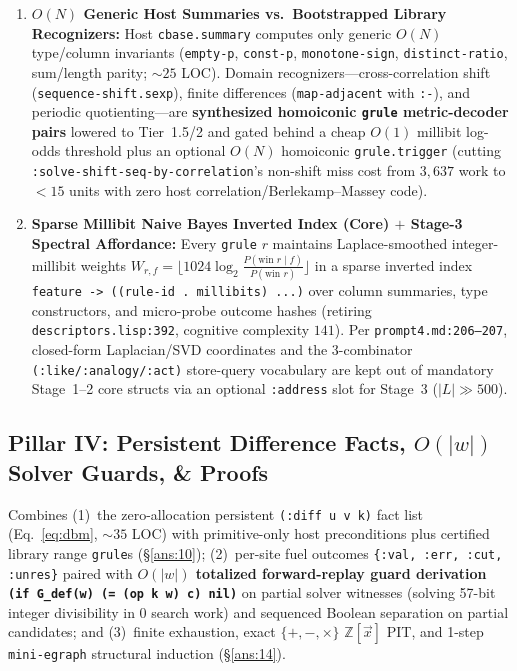 \documentclass[12pt]{article}
\begin{document}
\begin{enumerate}[leftmargin=1.6em, itemsep=0.2em]
  \item \textbf{$O(N)$ Generic Host Summaries vs.\ Bootstrapped Library Recognizers:} Host \texttt{cbase.summary} computes only generic $O(N)$ type/column invariants (\texttt{empty-p}, \texttt{const-p}, \texttt{monotone-sign}, \texttt{distinct-ratio}, sum/length parity; $\sim 25$ LOC). Domain recognizers---cross-correlation shift (\texttt{sequence-shift.sexp}), finite differences (\texttt{map-adjacent} with \texttt{:-}), and periodic quotienting---are \textbf{synthesized homoiconic \texttt{grule} metric-decoder pairs} lowered to Tier~1.5/2 and gated behind a cheap $O(1)$ millibit log-odds threshold plus an optional $O(N)$ homoiconic \texttt{grule.trigger} (cutting \texttt{:solve-shift-seq-by-correlation}'s non-shift miss cost from $3,637$ work to $<15$ units with zero host correlation/Berlekamp--Massey code).
  \item \textbf{Sparse Millibit Naive Bayes Inverted Index (Core) $+$ Stage-3 Spectral Affordance:} Every \texttt{grule} $r$ maintains Laplace-smoothed integer-millibit weights $W_{r,f} = \lfloor 1024 \log_2 \frac{P(\text{win }r\mid f)}{P(\text{win }r)}\rfloor$ in a sparse inverted index \texttt{feature -> ((rule-id . millibits) ...)} over column summaries, type constructors, and micro-probe outcome hashes (retiring \texttt{descriptors.lisp:392}, cognitive complexity $141$). Per \texttt{prompt4.md:206--207}, closed-form Laplacian/SVD coordinates and the 3-combinator \texttt{(:like/:analogy/:act)} store-query vocabulary are kept out of mandatory Stage~1--2 core structs via an optional \texttt{:address} slot for Stage~3 ($|L|\gg 500$).
\end{enumerate}

\subsection{Pillar IV: Persistent Difference Facts, \texorpdfstring{$O(|w|)$}{O(|w|)} Solver Guards, \& Proofs}
\label{sec:arch-proofs}

Combines (1)~the zero-allocation persistent \texttt{(:diff u v k)} fact list (Eq.~\ref{eq:dbm}, $\sim 35$ LOC) with primitive-only host preconditions plus certified library range \texttt{grule}s (\S\ref{ans:10}); (2)~per-site fuel outcomes \texttt{\{:val, :err, :cut, :unres\}} paired with \textbf{$O(|w|)$ totalized forward-replay guard derivation \texttt{(if G\_def(w) (= (op k w) c) nil)}} on partial solver witnesses (solving 57-bit integer divisibility in $0$ search work) and sequenced Boolean separation on partial candidates; and (3)~finite exhaustion, exact $\{+,-,\times\}$ $\mathbb{Z}[\vec{x}]$ PIT, and 1-step \texttt{mini-egraph} structural induction (\S\ref{ans:14}).
\end{document}
